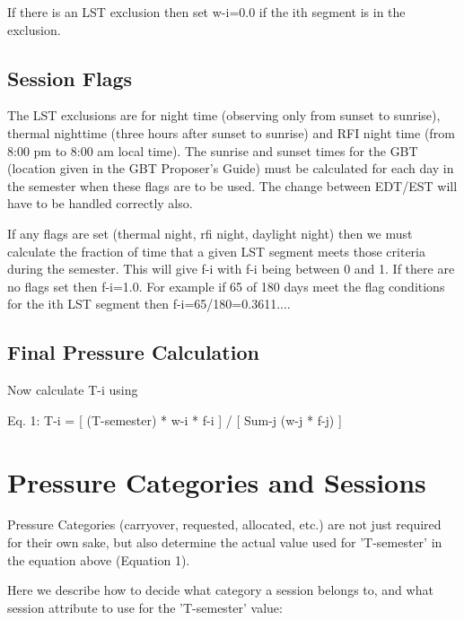 \documentclass{article}
\begin{document}
If there is an LST exclusion then set w-i=0.0 if the ith segment is in the exclusion.

\subsection{Session Flags}

The LST exclusions are for night time (observing only from sunset to sunrise), thermal nighttime (three hours after sunset to sunrise) and RFI night time (from 8:00 pm to 8:00 am local time). The sunrise and sunset times for the GBT (location given in the GBT Proposer's Guide) must be calculated for each day in the semester when these flags are to be used. The change between EDT/EST will have to be handled correctly also.

If any flags are set (thermal night, rfi night, daylight night) then we must calculate the fraction of time that a given LST segment meets those criteria during the semester. This will give f-i with f-i being between 0 and 1. If there are no flags set then f-i=1.0. For example if 65 of 180 days meet the flag conditions for the ith LST segment then f-i=65/180=0.3611.... 

\subsection{Final Pressure Calculation}

Now calculate T-i using

Eq. 1:
T-i = [ (T-semester) * w-i * f-i ] / [ Sum-j (w-j * f-j) ]

\section{Pressure Categories and Sessions}

Pressure Categories (carryover, requested, allocated, etc.) are not just required for their own sake, but also determine the actual value used for 'T-semester' in the equation above (Equation 1).

Here we describe how to decide what category a session belongs to, and what session attribute to use for the 'T-semester' value:
\end{document}
